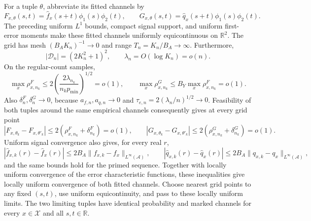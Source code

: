 For a tuple \(\theta\), abbreviate its fitted channels by
\[
 F_{x,\theta}(s,t)=\widehat f_x(s+t)\phi_1(s)\phi_2(t),
 \qquad
 G_{x,\theta}(s,t)=\widehat q_x(s+t)\phi_1(s)\phi_2(t).
\]
The preceding uniform \(L^1\) bounds, compact signal support, and uniform first-error moments make these fitted channels uniformly equicontinuous on \(\mathbb R^2\). The grid has mesh \((B_AK_n)^{-1}\to0\) and range \(T_n=K_n/B_A\to\infty\). Furthermore,
\[
 |\mathcal D_n|=(2K_n^2+1)^2,
 \qquad \lambda_n=O(\log K_n)=o(n).
\]
On the regular-count samples,
\[
 \max_x\rho^F_{x,n_k}
 \le2\left(\frac{2\lambda_{n_k}}{n_kp_{\min}}\right)^{1/2}=o(1),
 \qquad
 \max_x\rho^G_{x,n_k}\le B_Y\max_x\rho^F_{x,n_k}=o(1).
\]
Also \(\delta^F_n,\delta^G_n\to0\), because \(a_{f,n},a_{q,n}\to0\) and \(\tau_{e,n}=2(\lambda_n/n)^{1/2}\to0\). Feasibility of both tuples around the same empirical channels consequently gives at every grid point
\[
 |F_{x,\theta_k}-F_{x,\theta'_k}|
 \le2(\rho^F_{x,n_k}+\delta^F_{n_k})=o(1),
 \qquad
 |G_{x,\theta_k}-G_{x,\theta'_k}|
 \le2(\rho^G_{x,n_k}+\delta^G_{n_k})=o(1).
\]
Uniform signal convergence also gives, for every real \(r\),
\[
 |\widehat f_{x,k}(r)-\widehat f_x(r)|
 \le2B_A\|f_{x,k}-f_x\|_{L^\infty(\mathcal A)},
 \qquad
 |\widehat q_{x,k}(r)-\widehat q_x(r)|
 \le2B_A\|q_{x,k}-q_x\|_{L^\infty(\mathcal A)},
\]
and the same bounds hold for the primed sequence. Together with locally uniform convergence of the error characteristic functions, these inequalities give locally uniform convergence of both fitted channels. Choose nearest grid points to any fixed \((s,t)\), use uniform equicontinuity, and pass to these locally uniform limits. The two limiting tuples have identical probability and marked channels for every \(x\in\mathcal X\) and all \(s,t\in\mathbb R\).

